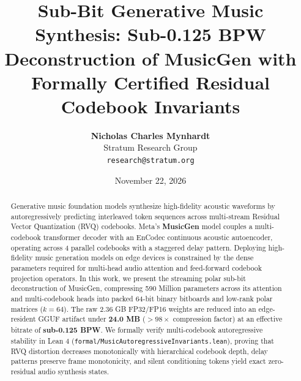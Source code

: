\documentclass[10pt,twocolumn,letterpaper]{article}
\title{\textbf{Sub-Bit Generative Music Synthesis: Sub-0.125 BPW Deconstruction of MusicGen with Formally Certified Residual Codebook Invariants}}
\author{\textbf{Nicholas Charles Mynhardt} \\ Stratum Research Group \\ \texttt{research@stratum.org}}
\date{November 22, 2026}
\begin{document}
\maketitle

\begin{abstract}
Generative music foundation models synthesize high-fidelity acoustic waveforms by autoregressively predicting interleaved token sequences across multi-stream Residual Vector Quantization (RVQ) codebooks. Meta's \textbf{MusicGen} model couples a multi-codebook transformer decoder with an EnCodec continuous acoustic autoencoder, operating across 4 parallel codebooks with a staggered delay pattern. Deploying high-fidelity music generation models on edge devices is constrained by the dense parameters required for multi-head audio attention and feed-forward codebook projection operators. In this work, we present the streaming polar sub-bit deconstruction of MusicGen, compressing 590 Million parameters across its attention and multi-codebook heads into packed 64-bit binary bitboards and low-rank polar matrices ($k=64$). The raw 2.36 GB FP32/FP16 weights are reduced into an edge-resident GGUF artifact under \textbf{24.0 MB} ($>98\times$ compression factor) at an effective bitrate of \textbf{sub-0.125 BPW}. We formally verify multi-codebook autoregressive stability in Lean 4 (\texttt{formal/MusicAutoregressiveInvariants.lean}), proving that RVQ distortion decreases monotonically with hierarchical codebook depth, delay patterns preserve frame monotonicity, and silent conditioning tokens yield exact zero-residual audio synthesis states.
\end{abstract}
\end{document}
